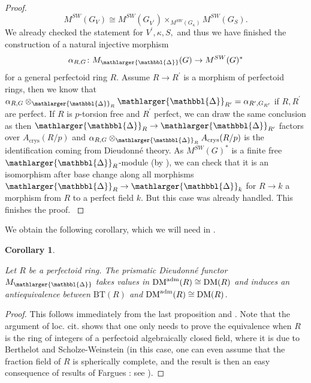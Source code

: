 \documentclass{amsart}
\newcommand{\prism}{{\mathlarger{\mathbbl{\Delta}}}}
\theoremstyle{plain}
\newtheorem{corollary}[theorem]{Corollary}
\theoremstyle{definition}
\newcommand{\crys}{\mathrm{crys}}
\newcommand{\BT}{\mathrm{BT}}
\newcommand{\DM}{\mathrm{DM}}
\newcommand{\red}[1]{{\color{black} #1}}
\begin{document}
\begin{proof}
{    \[
      M^{SW}(G_V)\cong M^{SW}(G_{V^\prime})\times_{M^{SW}(G_\kappa)}M^{SW}(G_S).
    \]
    We already checked the statement for $V^\prime,\kappa, S,$ and thus we have finished the construction of a natural injective morphism
    \[
      \alpha_{R,G}\colon M_\prism(G)\to M^{SW}(G)^\ast
    \]
    for a general perfectoid ring $R$. Assume $R\to R^\prime$ is a morphism of perfectoid rings, then we know that $\alpha_{R,G}\otimes_{\prism_R}\prism_{R^\prime}=\alpha_{R^\prime,G_{R^\prime}}$ if $R,R^\prime$ are perfect. If $R$ is $p$-torsion free and $R^\prime$ perfect, we can draw the same conclusion as then $\prism_{R}\to \prism_{R^\prime}$ factors over $A_\crys(R/p)$ and $\alpha_{R,G}\otimes_{\prism_R} A_\crys(R/p)$ is the identification coming from Dieudonn\'e theory. As $M^{SW}(G)^\ast$ is a finite free $\prism_R$-module (by \cite[Theorem 17.5.2]{scholze2020berkeley}), we can check that it is an isomorphism after base change along all morphisms $\prism_R\to \prism_k$ for $R\to k$ a morphism from $R$ to a perfect field $k$. But this case was already handled. This finishes the proof. 
  }
\end{proof} 

We obtain the following corollary, which we will need in .

\begin{corollary}
\label{sec:prism-dieud-theory-comparison-with-bkf-modules-perfectoid-case}

Let $R$ be a perfectoid ring. The prismatic Dieudonn\'e functor $M_{\prism}$ \red{takes values in $\DM^{\rm adm}(R) \cong \DM(R)$} and induces an antiequivalence between $\BT(R)$ and $\DM^{\rm adm}(R)  \cong \DM(R)$.
\end{corollary}
\begin{proof}
This follows \red{immediately} from the last proposition and \cite[Theorem 17.5.2]{scholze2020berkeley}. Note that the argument of loc. cit. shows that one only needs to prove the equivalence when $R$ is the ring of integers of a perfectoid algebraically closed field, where it is due to Berthelot \cite[Theorem 3.4.1]{berthelot_theorie_de_dieudonne_sur_un_anneau_de_valuation_parfait} and Scholze-Weinstein \cite[Theorem 5.2.1]{scholze_weinstein_moduli_of_p_divisible_groups} (in this case, one can even assume that the fraction field of $R$ is spherically complete, and the result is then an easy consequence of results of Fargues : see \cite[\S 5.2]{scholze_weinstein_moduli_of_p_divisible_groups}). 
\end{proof} 
\end{document}
